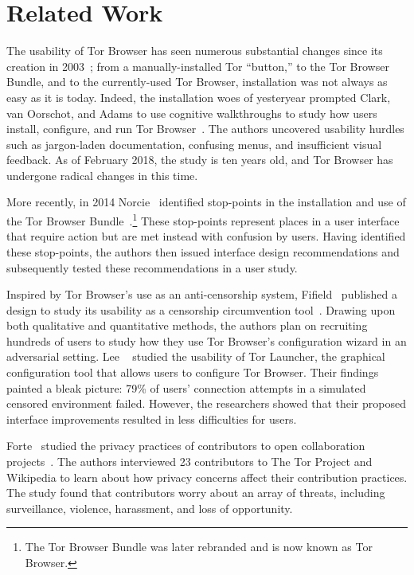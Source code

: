 \section{Related Work}
\label{sec:related-work}

The usability of Tor Browser has seen numerous substantial changes since its
creation in 2003~\cite{Syverson2005a}; from a manually-installed Tor ``button,''
to the Tor Browser Bundle, and to the currently-used Tor Browser, installation was
not always as easy as it is today. Indeed, the installation woes of yesteryear
prompted Clark, van Oorschot, and Adams 
to use cognitive walkthroughs to study how users install, configure, and run
Tor Browser~\cite{Clark2007a}.  The authors uncovered usability hurdles such as
jargon-laden documentation, confusing menus, and insufficient visual feedback.
As of February 2018, the study is ten years old, and Tor Browser has undergone
radical changes in this time.

More recently, in 2014 Norcie \ea\ identified stop-points in the
installation and use of the Tor Browser Bundle~\cite{Norcie2014a}.\footnote{The
Tor Browser Bundle was later rebranded and is now known as Tor Browser.}  These
stop-points represent places in a user interface that require action but are met
instead with confusion by users.  Having identified these stop-points, the
authors then issued interface design recommendations and subsequently tested
these recommendations in a user study.

Inspired by Tor Browser's use as an anti-censorship system, Fifield \ea\ published
a design to study its usability as a censorship circumvention
tool~\cite{Fifield2015a}.  Drawing upon both qualitative and quantitative
methods, the authors plan on recruiting hundreds of users to study how they use Tor
Browser's configuration wizard in an adversarial setting.  Lee
\ea~\cite{Lee2017a} studied the usability of Tor Launcher, the graphical
configuration tool that allows users to configure Tor Browser.  Their findings
painted a bleak picture: 79\% of users' connection attempts in a simulated
censored environment failed.  However, the researchers showed that their
proposed interface improvements resulted in less difficulties for users.

Forte \ea\ studied the privacy practices of contributors to open collaboration
projects~\cite{Forte2017a}.  The authors interviewed 23 contributors to The Tor
Project and Wikipedia to learn about how privacy concerns affect their
contribution practices.  The study found that contributors worry about an array
of threats, including surveillance, violence, harassment, and loss of
opportunity.

